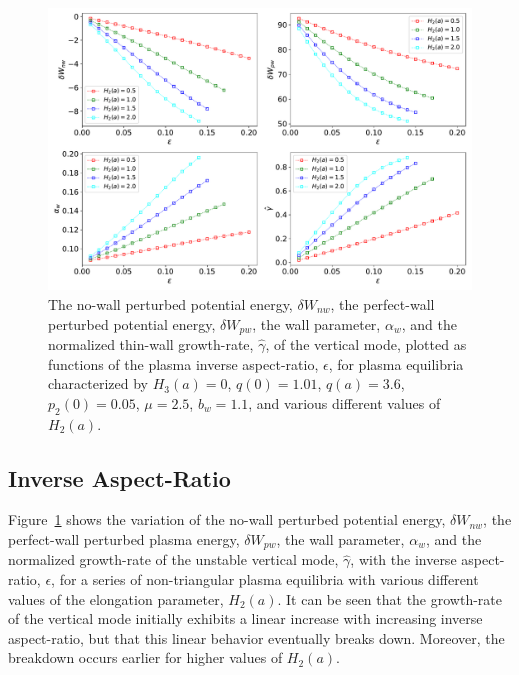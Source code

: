 \documentclass[12pt,prb,aps]{revtex4-1}
\begin{document}
\begin{figure}
\centerline{\includegraphics[width=\textwidth]{Fig3.pdf}}
\caption{The no-wall perturbed potential energy, $\delta W_{nw}$, the perfect-wall perturbed potential energy, $\delta W_{pw}$, the wall
parameter, $\alpha_w$, and the normalized thin-wall growth-rate, $\hat{\gamma}$,  of the  vertical mode, plotted as  functions of the
plasma  inverse aspect-ratio, $\epsilon$, for plasma equilibria characterized by   $H_3(a)=0$, $q(0)=1.01$, $q(a)=3.6$,  $p_2(0)=0.05$, $\mu=2.5$, $b_w=1.1$, and
various different values of $H_2(a)$.  \label{fig3}}
\end{figure}

\subsection{Inverse Aspect-Ratio}
Figure~\ref{fig3} shows the variation of the no-wall perturbed potential energy, $\delta W_{nw}$, the perfect-wall perturbed plasma energy, $\delta W_{pw}$, the wall 
parameter, $\alpha_w$, and the normalized growth-rate of the unstable vertical mode, $\hat{\gamma}$, with the inverse
aspect-ratio, $\epsilon$, for a series of
non-triangular plasma equilibria with various different values of the elongation parameter, $H_2(a)$. It can be seen that the growth-rate of the vertical 
mode initially exhibits a linear increase with increasing inverse aspect-ratio, but that this linear behavior eventually breaks down. Moreover, the breakdown occurs
earlier for higher values of $H_2(a)$. 
\end{document}
